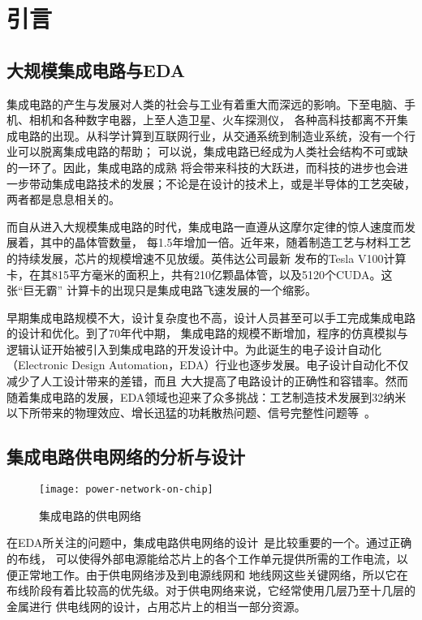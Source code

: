 \chapter{引言}
\label{cha:intro}

\section{大规模集成电路与EDA}

集成电路的产生与发展对人类的社会与工业有着重大而深远的影响。下至电脑、手机、相机和各种数字电器，上至人造卫星、火车探测仪，
各种高科技都离不开集成电路的出现。从科学计算到互联网行业，从交通系统到制造业系统，没有一个行业可以脱离集成电路的帮助；
可以说，集成电路已经成为人类社会结构不可或缺的一环了。因此，集成电路的成熟
将会带来科技的大跃进，而科技的进步也会进一步带动集成电路技术的发展；不论是在设计的技术上，或是半导体的工艺突破，两者都是息息相关的。

而自从进入大规模集成电路的时代，集成电路一直遵从这摩尔定律的惊人速度而发展着，其中的晶体管数量，
每1.5年增加一倍。近年来，随着制造工艺与材料工艺的持续发展，芯片的规模增速不见放缓。英伟达公司最新
发布的Tesla V100计算卡，在其815平方毫米的面积上，共有210亿颗晶体管，以及5120个CUDA。这张“巨无霸”
计算卡的出现只是集成电路飞速发展的一个缩影。

早期集成电路规模不大，设计复杂度也不高，设计人员甚至可以手工完成集成电路的设计和优化。到了70年代中期，
集成电路的规模不断增加，程序的仿真模拟与逻辑认证开始被引入到集成电路的开发设计中。为此诞生的电子设计自动化
（Electronic Design Automation，EDA）行业也逐步发展。电子设计自动化不仅减少了人工设计带来的差错，而且
大大提高了电路设计的正确性和容错率。然而随着集成电路的发展，EDA领域也迎来了众多挑战：工艺制造技术发展到32纳米
以下所带来的物理效应、增长迅猛的功耗散热问题、信号完整性问题等~\cite{shang2004thermal, swaminathan2010designing}。

\section{集成电路供电网络的分析与设计}

\begin{figure}[H] %
  \centering
  \texttt{[image: power-network-on-chip]}
  \caption{集成电路的供电网络}
  \label{fig:figpower}
\end{figure}

在EDA所关注的问题中，集成电路供电网络的设计~\cite{zhu2004power}是比较重要的一个。通过正确的布线，
可以使得外部电源能给芯片上的各个工作单元提供所需的工作电流，以便正常地工作。由于供电网络涉及到电源线网和
地线网这些关键网络，所以它在布线阶段有着比较高的优先级。对于供电网络来说，它经常使用几层乃至十几层的金属进行
供电线网的设计，占用芯片上的相当一部分资源。

